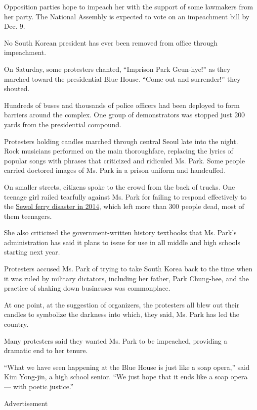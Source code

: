Opposition parties hope to impeach her with the support of some
lawmakers from her party. The National Assembly is expected to vote on
an impeachment bill by Dec. 9.

No South Korean president has ever been removed from office through
impeachment.

On Saturday, some protesters chanted, ``Imprison Park Geun-hye!'' as
they marched toward the presidential Blue House. ``Come out and
surrender!'' they shouted.

Hundreds of buses and thousands of police officers had been deployed to
form barriers around the complex. One group of demonstrators was stopped
just 200 yards from the presidential compound.

Protesters holding candles marched through central Seoul late into the
night. Rock musicians performed on the main thoroughfare, replacing the
lyrics of popular songs with phrases that criticized and ridiculed Ms.
Park. Some people carried doctored images of Ms. Park in a prison
uniform and handcuffed.

On smaller streets, citizens spoke to the crowd from the back of trucks.
One teenage girl railed tearfully against Ms. Park for failing to
respond effectively to the
\href{http://www.nytimes.com/interactive/2015/04/12/world/asia/12ferry-timeline.html?_r=0\#/\#time367_10822}{Sewol
ferry disaster in 2014}, which left more than 300 people dead, most of
them teenagers.

She also criticized the government-written history textbooks that Ms.
Park's administration has said it plans to issue for use in all middle
and high schools starting next year.

Protesters accused Ms. Park of trying to take South Korea back to the
time when it was ruled by military dictators, including her father, Park
Chung-hee, and the practice of shaking down businesses was commonplace.

At one point, at the suggestion of organizers, the protesters all blew
out their candles to symbolize the darkness into which, they said, Ms.
Park has led the country.

Many protesters said they wanted Ms. Park to be impeached, providing a
dramatic end to her tenure.

``What we have seen happening at the Blue House is just like a soap
opera,'' said Kim Yong-jin, a high school senior. ``We just hope that it
ends like a soap opera --- with poetic justice.''

Advertisement

